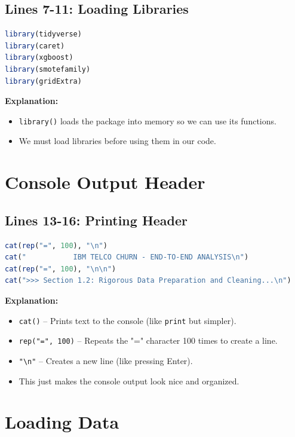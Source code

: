 \documentclass[12pt,a4paper]{article}
\begin{document}
\subsection{Lines 7-11: Loading Libraries}

\begin{lstlisting}[language=R]
library(tidyverse)
library(caret)
library(xgboost)
library(smotefamily)
library(gridExtra)
\end{lstlisting}

\textbf{Explanation:}
\begin{itemize}
    \item \texttt{library()} loads the package into memory so we can use its functions.
    \item We must load libraries before using them in our code.
\end{itemize}

\section{Console Output Header}

\subsection{Lines 13-16: Printing Header}

\begin{lstlisting}[language=R]
cat(rep("=", 100), "\n")
cat("           IBM TELCO CHURN - END-TO-END ANALYSIS\n")
cat(rep("=", 100), "\n\n")
cat(">>> Section 1.2: Rigorous Data Preparation and Cleaning...\n")
\end{lstlisting}

\textbf{Explanation:}
\begin{itemize}
    \item \texttt{cat()} -- Prints text to the console (like \texttt{print} but simpler).
    \item \texttt{rep("=", 100)} -- Repeats the "=" character 100 times to create a line.
    \item \texttt{"\textbackslash n"} -- Creates a new line (like pressing Enter).
    \item This just makes the console output look nice and organized.
\end{itemize}

\section{Loading Data}
\end{document}
